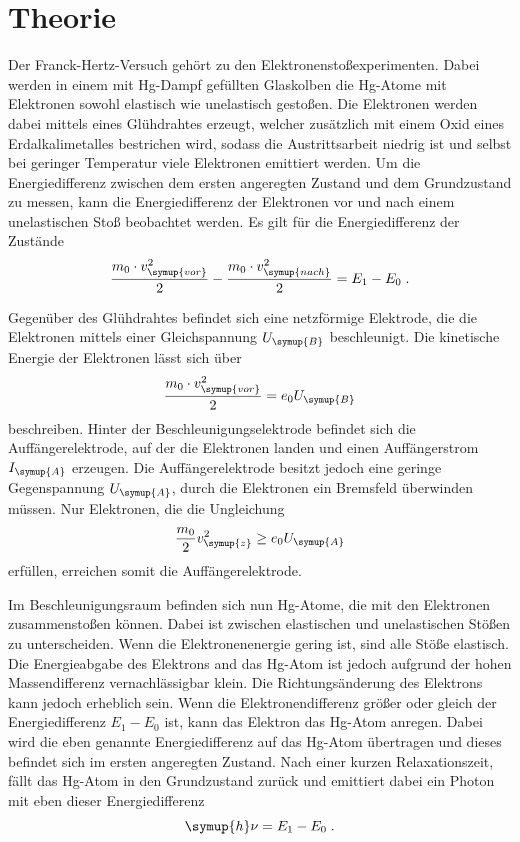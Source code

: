 \section{Theorie}
\label{sec:Theorie}

Der Franck-Hertz-Versuch gehört zu den Elektronenstoßexperimenten. Dabei werden in einem mit Hg-Dampf gefüllten Glaskolben die Hg-Atome mit Elektronen 
sowohl elastisch wie unelastisch gestoßen. Die Elektronen werden dabei mittels eines Glühdrahtes erzeugt, welcher zusätzlich mit einem Oxid eines 
Erdalkalimetalles bestrichen wird, sodass die Austrittsarbeit niedrig ist und selbst bei geringer Temperatur viele Elektronen emittiert werden.
Um die Energiedifferenz zwischen dem ersten angeregten Zustand und dem Grundzustand zu messen, kann die 
Energiedifferenz der Elektronen vor und nach einem unelastischen Stoß beobachtet werden. Es gilt für die Energiedifferenz der Zustände
\begin{equation*}
    \frac{m_0\cdot v^2_{\symup{vor}}}{2} - \frac{m_0\cdot v^2_{\symup{nach}}}{2} = E_1 - E_0 \; .
\end{equation*}

Gegenüber des Glühdrahtes befindet sich eine netzförmige Elektrode, die die Elektronen mittels einer Gleichspannung $U_{\symup{B}}$ beschleunigt. 
Die kinetische Energie der Elektronen lässt sich über 
\begin{equation*}
    \frac{m_0\cdot v^2_{\symup{vor}}}{2} = e_0U_{\symup{B}}
\end{equation*}
beschreiben.
Hinter der Beschleunigungselektrode befindet sich die Auffängerelektrode, auf der die Elektronen landen und einen Auffängerstrom $I_{\symup{A}}$ erzeugen.
Die Auffängerelektrode besitzt jedoch eine geringe Gegenspannung $U_{\symup{A}}$, durch die Elektronen ein Bremsfeld überwinden müssen. Nur Elektronen, 
die die Ungleichung
\begin{equation*}
    \frac{m_0}{2}v^2_{\symup{z}} \geq e_0U_{\symup{A}}
\end{equation*}
erfüllen, erreichen somit die Auffängerelektrode. 

Im Beschleunigungsraum befinden sich nun Hg-Atome, die mit den Elektronen zusammenstoßen können. Dabei ist zwischen elastischen und unelastischen Stößen 
zu unterscheiden. Wenn die Elektronenenergie gering ist, sind alle Stöße elastisch. Die Energieabgabe des Elektrons and das Hg-Atom ist jedoch aufgrund 
der hohen Massendifferenz vernachlässigbar klein. Die Richtungsänderung des Elektrons kann jedoch erheblich sein. 
Wenn die Elektronendifferenz größer oder gleich der Energiedifferenz $E_1 - E_0$ ist, kann das Elektron das Hg-Atom anregen. Dabei wird die eben 
genannte Energiedifferenz auf das Hg-Atom übertragen und dieses befindet sich im ersten angeregten Zustand. Nach einer kurzen Relaxationszeit, fällt
das Hg-Atom in den Grundzustand zurück und emittiert dabei ein Photon mit eben dieser Energiedifferenz
\begin{equation}
    \symup{h}\nu = E_1 - E_0 \; .
    \label{eqn:nu}
\end{equation}

